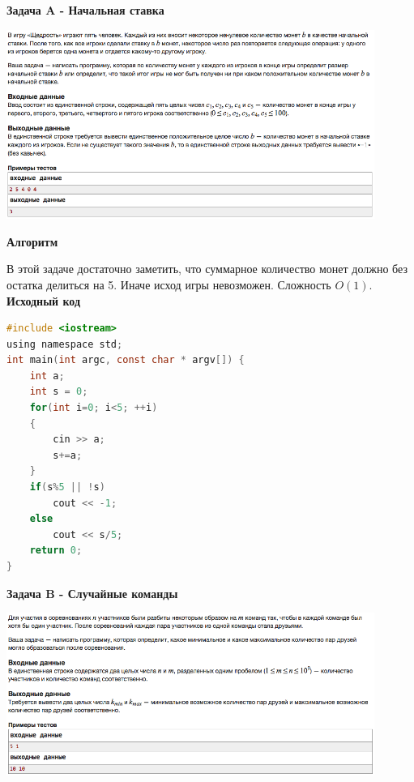 \documentclass[a4paper,12pt]{article}
\begin{document}
\newpage
\textbf{{\large Задача A - Начальная ставка}} \\
\begin{center}
\includegraphics[width=0.9\textwidth]{C_273/C_273_A.png}\\ [1cm]
\end{center}

\textbf{{\large Алгоритм}}

В этой задаче достаточно заметить, что суммарное количество монет должно без остатка делиться на 5. Иначе исход игры невозможен. Сложность $O(1)$.\\

\textbf{{\large Исходный код}} \\
\begin{lstlisting}[language=C]
#include <iostream>
using namespace std;
int main(int argc, const char * argv[]) {
    int a;
    int s = 0;
    for(int i=0; i<5; ++i)
    {
        cin >> a;
        s+=a;
    }
    if(s%5 || !s)
        cout << -1;
    else
        cout << s/5;
    return 0;
}
\end{lstlisting}

\newpage
\textbf{{\large Задача B - Случайные команды}} \\
\begin{center}
\includegraphics[width=0.9\textwidth]{C_273/C_273_B.png}\\ [1cm]
\end{center}
\end{document}
